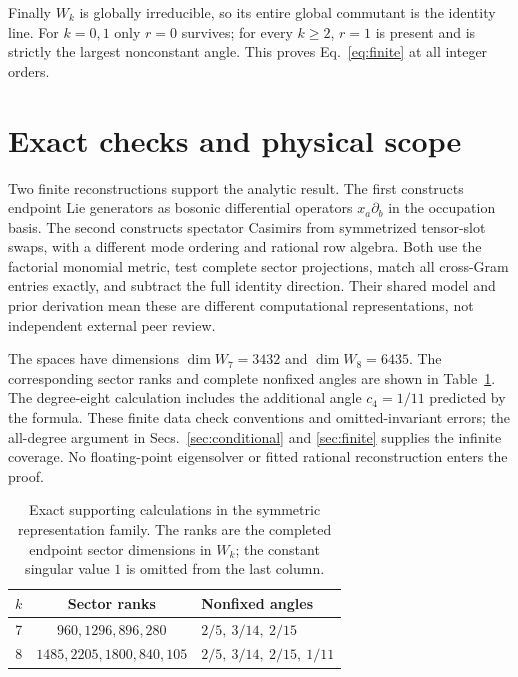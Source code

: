 \documentclass[aps,pra,reprint,amsmath,amssymb,longbibliography]{revtex4-2}
\begin{document}
Finally $W_k$ is globally irreducible, so its entire global commutant is the identity line. For $k=0,1$ only $r=0$ survives; for every $k\geq2$, $r=1$ is present and is strictly the largest nonconstant angle. This proves Eq.~\eqref{eq:finite} at all integer orders.

\section{Exact checks and physical scope}
\label{sec:scope}

Two finite reconstructions support the analytic result. The first constructs endpoint Lie generators as bosonic differential operators $x_a\partial_b$ in the occupation basis. The second constructs spectator Casimirs from symmetrized tensor-slot swaps, with a different mode ordering and rational row algebra. Both use the factorial monomial metric, test complete sector projections, match all cross-Gram entries exactly, and subtract the full identity direction. Their shared model and prior derivation mean these are different computational representations, not independent external peer review.

The spaces have dimensions $\dim W_7=3432$ and $\dim W_8=6435$. The corresponding sector ranks and complete nonfixed angles are shown in Table~\ref{tab:checks}. The degree-eight calculation includes the additional angle $c_4=1/11$ predicted by the formula. These finite data check conventions and omitted-invariant errors; the all-degree argument in Secs.~\ref{sec:conditional} and \ref{sec:finite} supplies the infinite coverage. No floating-point eigensolver or fitted rational reconstruction enters the proof.

\begin{table}[tb]
\caption{Exact supporting calculations in the symmetric representation family. The ranks are the completed endpoint sector dimensions in $W_k$; the constant singular value $1$ is omitted from the last column.}
\label{tab:checks}
\begin{ruledtabular}
\begin{tabular}{ccl}
$k$ & Sector ranks & Nonfixed angles\\
\hline
7 & $960,1296,896,280$ & $2/5,\ 3/14,\ 2/15$\\
8 & $1485,2205,1800,840,105$ & $2/5,\ 3/14,\ 2/15,\ 1/11$
\end{tabular}
\end{ruledtabular}
\end{table}
\end{document}
